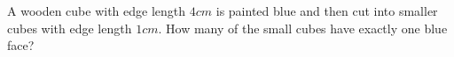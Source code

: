 A wooden cube with edge length $4cm$ is painted blue and then cut into smaller cubes with edge length $1cm$. How many of the small cubes have exactly one blue face?
